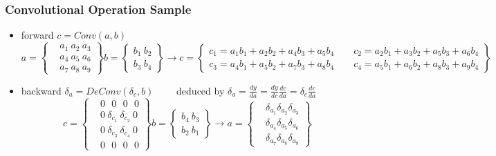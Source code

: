 \begin{frame}
\frametitle{Convolutional Operation Sample}
	\tiny
	\begin{itemize}
		\item forward $c=Conv(a,b)$
			\begin{equation*}
				a=
				\left\{
					\begin{aligned}
						  &a_1 \ a_2 \ a_3 
						\\&a_4 \ a_5 \ a_6
						\\&a_7 \ a_8 \ a_9
					\end{aligned}
				\right\}
				b=
				\left\{
					\begin{aligned}
						  b_1 \ b_2
						\\b_3 \ b_4 
					\end{aligned}
				\right\}
			\to	c=
				\left\{
					\begin{aligned}
						  c_1=a_1b_1+a_2b_2+a_4b_3+a_5b_4 \qquad c_2=a_2b_1+a_3b_2+a_5b_3+a_6b_4
						\\c_3=a_4b_1+a_5b_2+a_7b_3+a_8b_4 \qquad c_4=a_5b_1+a_6b_2+a_8b_3+a_9b_4
					\end{aligned}
				\right\}
			\end{equation*}
		\item backward $\delta_a=DeConv(\delta_c,b) \qquad $ deduced by $\delta_a=\frac{dy}{da}=\frac{dy}{dc}\frac{dc}{da}=\delta_c\frac{dc}{da}$
			\begin{equation*}
				c=
				\left\{
					\begin{aligned}
						   &0 \ \ \  0 \ \ \ 0 \ \ \ 0
						\\ &0 \  \delta_{c_1} \ \delta_{c_2} \ 0
						\\ &0 \  \delta_{c_3} \ \delta_{c_4} \ 0
						\\ &0 \ \ \  0 \ \ \ 0 \ \ \ 0
					\end{aligned}
				\right\}
				b=	
				\left\{
					\begin{aligned}
						  b_4 \ b_3
						\\b_2 \ b_1 
					\end{aligned}
				\right\}
		\to	
				a=
				\left\{
					\begin{aligned}
						  &\delta_{a_1}
						  \delta_{a_2}
						  \delta_{a_3}
					   \\ &\delta_{a_4}
						  \delta_{a_5}
						  \delta_{a_6}
					   \\ &\delta_{a_7}
						  \delta_{a_8}
						  \delta_{a_9}
					\end{aligned}
				\right\}
			\end{equation*}

\end{itemize}
\end{frame}
